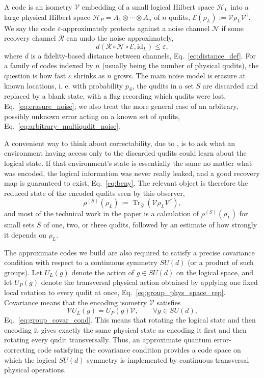 \documentclass[10pt,twocolumn,superscriptaddress,aps,amsmath,amssymb,citeautoscript,floatfix,prx]{revtex4-2}
\theoremstyle{plain}
\theoremstyle{plain}
\theoremstyle{plain}
\theoremstyle{plain}
\theoremstyle{plain}
\theoremstyle{plain}
\theoremstyle{plain}
\theoremstyle{definition}
\theoremstyle{plain}
\begin{document}
A code is an isometry $\mathcal{V}$ embedding of a small logical Hilbert space $\mathcal H_L$ into a large physical Hilbert space $\mathcal H_P=A_1\otimes\cdots\otimes A_n$ of $n$ qudits, $\mathcal E(\rho_L):=\mathcal{V}\rho_L\mathcal{V}^\dagger$. 
We say the code $\varepsilon$-approximately protects against a noise channel $\mathcal N$ if some recovery channel $\mathcal R$ can undo the noise approximately,
$$
d(\mathcal R\circ\mathcal N\circ\mathcal E,\mathrm{id}_L)\le \varepsilon,
$$
where $d$ is a fidelity-based distance between channels, Eq.~\eqref{eq:distance_def}. For a family of codes indexed by $n$ (usually being the number of physical qudits), the question is how fast $\varepsilon$ shrinks as $n$ grows. 
The main noise model is erasure at known locations, i. e. with probability $p_S$, the qudits in a set $S$ are discarded and replaced by a blank state, with a flag recording which qudits were lost, Eq.~\eqref{eq:erasure_noise}; we also treat the more general case of an arbitrary, possibly unknown error acting on a known set of qudits, Eq.~\eqref{eq:arbitrary_multiqudit_noise}.
 
A convenient way to think about correctability, due to \citet{Beny2010}, is to ask what an environment having access only to the discarded qudits could learn about the logical state. If that environment's state is essentially the same no matter what was encoded, the logical information was never really leaked, and a good recovery map is guaranteed to exist, Eq.~\eqref{eq:beny}. 
The relevant object is therefore the reduced state of the encoded qudits seen by this observer,
$$
\rho^{(S)}(\rho_L):=\operatorname{Tr}_{\hat S}\!\left(\mathcal{V}\rho_L\mathcal{V}^\dagger\right),
$$
and most of the technical work in the paper is a calculation of $\rho^{(S)}(\rho_L)$ for small sets $S$ of one, two, or three qudits, followed by an estimate of how strongly it depends on $\rho_L$.
 
The approximate codes we build are also required to satisfy a precise covariance condition with respect to a continuous symmetry $SU(d)$ (or a product of such groups). 
Let $U_L(g)$ denote the action of $g\in SU(d)$ on the logical space, and let $U_P(g)$ denote the transversal physical action obtained by applying one fixed local rotation to every qudit at once, 
Eq.~\eqref{eq:group_phys_space_rep}. Covariance means that the encoding isometry $\mathcal{V}$ satisfies
$$
\mathcal{V}U_L(g)=U_P(g)\mathcal{V},\qquad \forall g\in SU(d),
$$
Eq.~\eqref{eq:group_covar_cond}. This means that rotating the logical state and then encoding it gives exactly the same physical state as encoding it first and then rotating every qudit transversally. 
Thus, an approximate quantum error-correcting code satisfying the covariance condition provides a code space on which the logical $SU(d)$ symmetry is implemented by continuous transversal physical operations.
\end{document}
